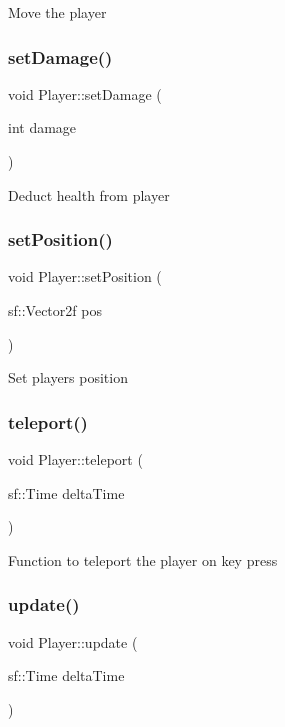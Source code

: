 Move the player \mbox{\label{class_player_a065d28e46d0660eff17bad53f2efd622}} 
\subsubsection{\texorpdfstring{set\+Damage()}{setDamage()}}
{\footnotesize\ttfamily void Player\+::set\+Damage (\begin{DoxyParamCaption}\item[{int}]{damage }\end{DoxyParamCaption})}

Deduct health from player \mbox{\label{class_player_a04a1bb340ea6d425fb2927c397e96e4e}} 
\subsubsection{\texorpdfstring{set\+Position()}{setPosition()}}
{\footnotesize\ttfamily void Player\+::set\+Position (\begin{DoxyParamCaption}\item[{sf\+::\+Vector2f}]{pos }\end{DoxyParamCaption})}

Set player\textquotesingle{}s position \mbox{\label{class_player_ad975c53e4e2e21b597079e59c1ed0262}} 
\subsubsection{\texorpdfstring{teleport()}{teleport()}}
{\footnotesize\ttfamily void Player\+::teleport (\begin{DoxyParamCaption}\item[{sf\+::\+Time}]{delta\+Time }\end{DoxyParamCaption})}

Function to teleport the player on key press \mbox{\label{class_player_aeb1ca63f5401afa5d6aef2f308481672}} 
\subsubsection{\texorpdfstring{update()}{update()}}
{\footnotesize\ttfamily void Player\+::update (\begin{DoxyParamCaption}\item[{sf\+::\+Time}]{delta\+Time }\end{DoxyParamCaption})}

